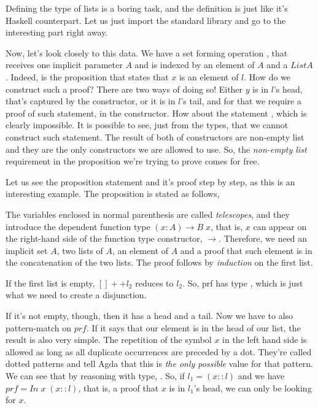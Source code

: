 Defining the type of lists is a boring task, and the definition is just like
it's Haskell counterpart. Let us just import the standard library and go to the
interesting part right away.


Now, let's look closely to this data. We have a set forming operation , that receives
one implicit parameter $A$ and is indexed by an element of $A$ and a $List A$. Indeed, 
is the proposition that states that $x$ is an element of $l$. How do we construct such a proof?
There are two ways of doing so! Either $y$ is in $l$'s head, that's captured by the 
constructor, or it is in $l$'s tail, and for that we require a proof of such statement, in the 
constructor. How about the statement , which is clearly impossible. It is possible to see,
just from the types, that we cannot construct such statement. The result of both of  constructors
are non-empty list and they are the only constructors we are allowed to use. So, the \emph{non-empty list}
requirement in the proposition we're trying to prove comes for free.

Let us see the proposition statement and it's proof step by step, as this is an interesting example.
The proposition is stated as follows,


The variables enclosed in normal parenthesis are called \emph{telescopes}, and they introduce
the dependent function type $(x : A) \rightarrow B\;x$, that is, $x$ can appear on the right-hand side of
the function type constructor, $\rightarrow$. Therefore, we need an implicit set $A$, two lists of $A$,
an element of $A$ and a proof that such element is in the concatenation of the two lists.
The proof follows by \emph{induction} on the first list. 


If the first list is empty, $[] ++ l_2$ reduces to $l_2$. So, prf has type , which
is just what we need to create a disjunction.


If it's not empty, though, then it has a head and a tail. Now we have to also pattern-match
on $prf$. If it says that our element is in the head of our list, the result is also very simple.
The repetition of the symbol $x$ in the left hand side is allowed as long as all duplicate occurrences
are preceded by a dot. They're called dotted patterns and tell Agda that this is \emph{the only possible}
value for that pattern. We can see that by reasoning with  type, . 
So, if $l_1 = (x :: l)$ and we have $prf = In\; x\; (x :: l)$, that is, a proof that $x$ is in $l_1$'s head,
we can only be looking for $x$. 

